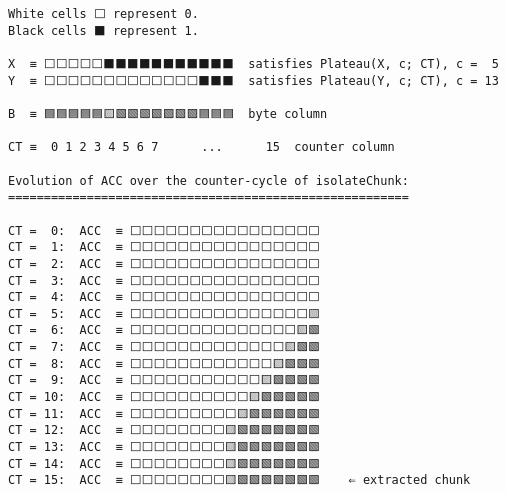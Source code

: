 \documentclass[varwidth=\maxdimen,margin=0.5cm,multi={verbatim}]{standalone}
\begin{document}
\begin{verbatim}
White cells ⬜ represent 0.
Black cells ⬛ represent 1.

X  ≡ ⬜⬜⬜⬜⬜⬛⬛⬛⬛⬛⬛⬛⬛⬛⬛⬛  satisfies Plateau(X, c; CT), c =  5
Y  ≡ ⬜⬜⬜⬜⬜⬜⬜⬜⬜⬜⬜⬜⬜⬛⬛⬛  satisfies Plateau(Y, c; CT), c = 13

B  ≡ 🟦🟦🟦🟦🟦🟨🟩🟩🟩🟩🟩🟩🟩🟦🟦🟦  byte column

CT ≡  0 1 2 3 4 5 6 7      ...      15  counter column

Evolution of ACC over the counter-cycle of isolateChunk:
========================================================

CT =  0:  ACC  ≡ ⬜⬜⬜⬜⬜⬜⬜⬜⬜⬜⬜⬜⬜⬜⬜⬜
CT =  1:  ACC  ≡ ⬜⬜⬜⬜⬜⬜⬜⬜⬜⬜⬜⬜⬜⬜⬜⬜
CT =  2:  ACC  ≡ ⬜⬜⬜⬜⬜⬜⬜⬜⬜⬜⬜⬜⬜⬜⬜⬜
CT =  3:  ACC  ≡ ⬜⬜⬜⬜⬜⬜⬜⬜⬜⬜⬜⬜⬜⬜⬜⬜
CT =  4:  ACC  ≡ ⬜⬜⬜⬜⬜⬜⬜⬜⬜⬜⬜⬜⬜⬜⬜⬜
CT =  5:  ACC  ≡ ⬜⬜⬜⬜⬜⬜⬜⬜⬜⬜⬜⬜⬜⬜⬜🟨
CT =  6:  ACC  ≡ ⬜⬜⬜⬜⬜⬜⬜⬜⬜⬜⬜⬜⬜⬜🟨🟩
CT =  7:  ACC  ≡ ⬜⬜⬜⬜⬜⬜⬜⬜⬜⬜⬜⬜⬜🟨🟩🟩
CT =  8:  ACC  ≡ ⬜⬜⬜⬜⬜⬜⬜⬜⬜⬜⬜⬜🟨🟩🟩🟩
CT =  9:  ACC  ≡ ⬜⬜⬜⬜⬜⬜⬜⬜⬜⬜⬜🟨🟩🟩🟩🟩
CT = 10:  ACC  ≡ ⬜⬜⬜⬜⬜⬜⬜⬜⬜⬜🟨🟩🟩🟩🟩🟩
CT = 11:  ACC  ≡ ⬜⬜⬜⬜⬜⬜⬜⬜⬜🟨🟩🟩🟩🟩🟩🟩
CT = 12:  ACC  ≡ ⬜⬜⬜⬜⬜⬜⬜⬜🟨🟩🟩🟩🟩🟩🟩🟩
CT = 13:  ACC  ≡ ⬜⬜⬜⬜⬜⬜⬜⬜🟨🟩🟩🟩🟩🟩🟩🟩
CT = 14:  ACC  ≡ ⬜⬜⬜⬜⬜⬜⬜⬜🟨🟩🟩🟩🟩🟩🟩🟩
CT = 15:  ACC  ≡ ⬜⬜⬜⬜⬜⬜⬜⬜🟨🟩🟩🟩🟩🟩🟩🟩    ⇐ extracted chunk
\end{verbatim}
\end{document}
